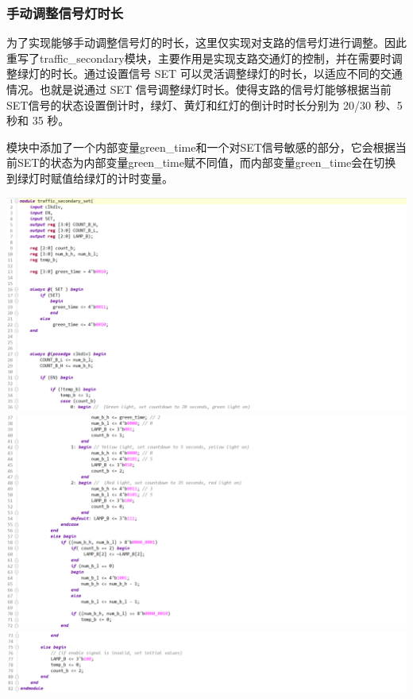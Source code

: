 \documentclass[a4,10pt,zihao=-4]{ctexart}
\begin{document}
\subsubsection{手动调整信号灯时长}

为了实现能够手动调整信号灯的时长，这里仅实现对支路的信号灯进行调整。因此重写了traffic\_secondary模块，主要作用是实现支路交通灯的控制，并在需要时调整绿灯的时长。通过设置信号 SET 可以灵活调整绿灯的时长，以适应不同的交通情况。也就是说通过 SET 信号调整绿灯时长。使得支路的信号灯能够根据当前SET信号的状态设置倒计时，绿灯、黄灯和红灯的倒计时时长分别为 20/30 秒、5 秒和 35 秒。

模块中添加了一个内部变量green\_time和一个对SET信号敏感的部分，它会根据当前SET的状态为内部变量green\_time赋不同值，而内部变量green\_time会在切换到绿灯时赋值给绿灯的计时变量。

\vspace{1em}

\noindent\includegraphics[width=1\textwidth]{traffic_secondary_set_1_code.png}
\noindent\includegraphics[width=1\textwidth]{traffic_secondary_set_2_code.png}
\noindent\includegraphics[width=1\textwidth]{traffic_secondary_set_3_code.png}
\end{document}
